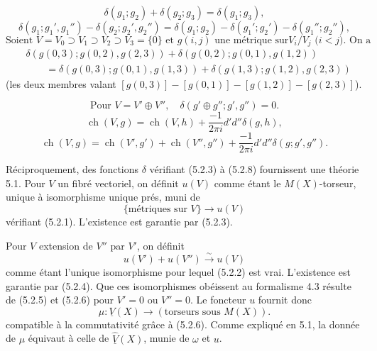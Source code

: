 \documentclass[12pt,a4paper]{article}
\theoremstyle{plain}
\theoremstyle{definition}
\DeclareMathOperator{\ch}{ch}
\begin{document}
\begin{equation}\label{eq:5.2.3}
\delta(g_1; g_2) + \delta(g_2; g_3) = \delta(g_1; g_3),
\end{equation}
\begin{equation}\label{eq:5.2.4}
\delta(g_1; g_1', g_1'') - \delta(g_2; g_2', g_2'') = \delta(g_1; g_2) - \delta(g_1'; g_2') - \delta(g_1''; g_2''),
\end{equation}
\begin{equation}\label{eq:5.2.5}
\text{Soient } V = V_0 \supset V_1 \supset V_2 \supset V_3 = \{0\} \text{ et } g(i,j) \text{ une m\'etrique sur}
V_i/V_j \text{ ($i < j$). On a}
\end{equation}
\[
\begin{aligned}
&\delta(g(0,3); g(0,2), g(2,3)) + \delta(g(0,2); g(0,1), g(1,2)) \\
&\qquad = \delta(g(0,3); g(0,1), g(1,3)) + \delta(g(1,3); g(1,2), g(2,3))
\end{aligned}
\]
(les deux membres valant $[g(0,3)] - [g(0,1)] - [g(1,2)] - [g(2,3)]$).

\begin{equation}\label{eq:5.2.6}
\text{Pour } V = V' \oplus V'', \quad \delta(g' \oplus g''; g', g'') = 0.
\end{equation}
\begin{equation}\label{eq:5.2.7}
\ch(V, g) = \ch(V, h) + \frac{-1}{2\pi i} d'd'' \delta(g, h),
\end{equation}
\begin{equation}\label{eq:5.2.8}
\ch(V, g) = \ch(V', g') + \ch(V'', g'') + \frac{-1}{2\pi i} d'd'' \delta(g; g', g'').
\end{equation}

R\'eciproquement, des fonctions $\delta$ v\'erifiant (5.2.3) \`a (5.2.8) fournissent
une th\'eorie 5.1. Pour $V$ un fibr\'e vectoriel, on d\'efinit $u(V)$ comme \'etant le
$M(X)$-torseur, unique \`a isomorphisme unique pr\'es, muni de
\[
\{\text{m\'etriques sur } V\} \longrightarrow u(V)
\]
v\'erifiant (5.2.1). L'existence est garantie par (5.2.3).

Pour $V$ extension de $V''$ par $V'$, on d\'efinit
\[
u(V') + u(V'') \xrightarrow{\sim} u(V)
\]
comme \'etant l'unique isomorphisme pour lequel (5.2.2) est vrai. L'existence est
garantie par (5.2.4). Que ces isomorphismes ob\'eissent au formalisme 4.3 r\'esulte
de (5.2.5) et (5.2.6) pour $V' = 0$ ou $V'' = 0$. Le foncteur $u$ fournit donc
\[
\mu: \underline{V}(X) \longrightarrow (\text{torseurs sous } M(X)) .
\]
compatible \`a la commutativit\'e gr\^ace \`a (5.2.6). Comme expliqu\'e en 5.1, la donn\'ee
de $\mu$ \'equivaut \`a celle de $\widehat{\underline{V}}(X)$, munie de $\omega$ et $u$.
\end{document}
